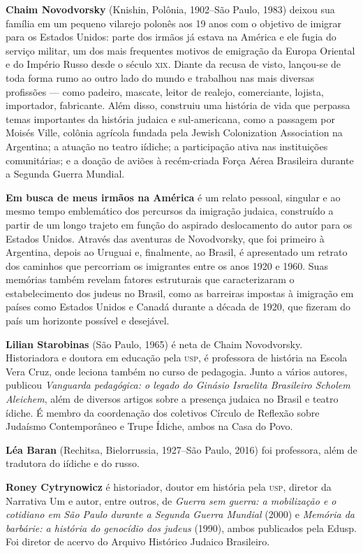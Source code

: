 \textbf{Chaim Novodvorsky} (Knishin, Polônia, 1902--São Paulo, 1983) deixou sua família em um pequeno vilarejo polonês aos 19 anos com o objetivo de imigrar para os Estados Unidos: parte dos irmãos já estava na América e ele fugia do serviço militar, um dos mais frequentes motivos de emigração da Europa Oriental e do Império Russo desde o século \textsc{xix}. Diante da recusa de visto, lançou-se de toda forma rumo ao outro lado do mundo e trabalhou nas mais diversas profissões --- como padeiro, mascate, leitor de realejo, comerciante, lojista, importador, fabricante. Além disso, construiu uma história de vida que perpassa temas importantes da história judaica e sul-americana, como a passagem por Moisés Ville, colônia agrícola fundada pela Jewish Colonization Association na Argentina; a atuação no teatro iídiche; a participação ativa nas instituições comunitárias; e a doação de aviões à recém-criada Força Aérea Brasileira durante a Segunda Guerra Mundial.

\textbf{Em busca de meus irmãos na América} é um relato pessoal, singular e ao mesmo tempo emblemático dos percursos da imigração judaica, construído a partir de um longo trajeto em função do aspirado deslocamento do autor para os Estados Unidos. Através das aventuras de Novodvorsky, que foi primeiro à Argentina, depois ao Uruguai e, finalmente, ao Brasil, é apresentado um retrato dos caminhos que percorriam os imigrantes entre os anos 1920 e 1960. Suas memórias também revelam fatores estruturais que caracterizaram o estabelecimento dos judeus no Brasil, como as barreiras impostas à imigração em países como Estados Unidos e Canadá durante a década de 1920, que fizeram do país um horizonte possível e desejável.

\pagebreak

\textbf{Lilian Starobinas} (São Paulo, 1965) é neta de Chaim Novodvorsky. Historiadora e doutora em educação pela \textsc{usp}, é professora de história na Escola Vera Cruz, onde leciona também no curso de pedagogia. Junto a vários autores, publicou \textit{Vanguarda pedagógica: o legado do Ginásio Israelita Brasileiro Scholem Aleichem}, além de diversos artigos sobre a presença judaica no Brasil e teatro ídiche. É membro da coordenação dos coletivos Círculo de Reflexão sobre Judaísmo Contemporâneo e Trupe Ídiche, ambos na Casa do Povo. 

\textbf{Léa Baran} (Rechitsa, Bielorrussia, 1927--São Paulo, 2016) foi professora, além de tradutora do iídiche e do russo.

\textbf{Roney Cytrynowicz} é historiador, doutor em história pela \textsc{usp}, diretor da Narrativa Um e autor, entre outros, de \textit{Guerra sem guerra: a mobilização e o cotidiano em São Paulo durante a Segunda Guerra Mundial} (2000) e \textit{Memória da barbárie: a história do genocídio dos judeus} (1990), ambos publicados pela Edusp. Foi diretor de acervo do Arquivo Histórico Judaico Brasileiro.




